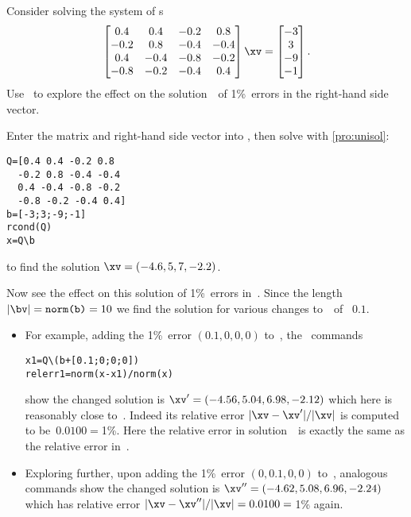 \begin{example}  
Consider solving the system of s
\begin{equation*}
\begin{bmatrix} 0.4&0.4&-0.2&0.8
\\-0.2&0.8&-0.4&-0.4
\\0.4&-0.4&-0.8&-0.2
\\-0.8&-0.2&-0.4&0.4 \end{bmatrix}\xv
=\begin{bmatrix} -3\\3\\-9\\-1 \end{bmatrix}.
\end{equation*}
Use \script\ to explore the effect on the solution~\xv\ of 1\%~errors in the right-hand side vector.
\begin{solution} 
Enter the matrix and right-hand side vector into \script, then solve  with \cref{pro:unisol}:
\setbox\ajrqrbox\hbox{}%
\marginajrbox%
\begin{verbatim}
Q=[0.4 0.4 -0.2 0.8
  -0.2 0.8 -0.4 -0.4
  0.4 -0.4 -0.8 -0.2
  -0.8 -0.2 -0.4 0.4]
b=[-3;3;-9;-1]
rcond(Q)
x=Q\b
\end{verbatim}
to find the solution \(\xv=(-4.6,5,7,-2.2)\).

Now see the effect on this solution of 1\%~errors in~\bv.
Since the length \(|\bv|=\verb|norm(b)|=10\) we find the solution for various changes to~\bv\ of ~\(0.1\).
\begin{itemize}\sloppy
\item For example, adding the 1\%~error \((0.1,0,0,0)\) to~\bv, the \script\ commands
\begin{verbatim}
x1=Q\(b+[0.1;0;0;0])
relerr1=norm(x-x1)/norm(x)
\end{verbatim}
show the changed solution is \(\xv'=(-4.56,5.04,6.98,-2.12)\) which here is reasonably close to~\xv.
Indeed its relative error \(|\xv-\xv'|/|\xv|\) is computed to be~\(0.0100={}\)1\%.
Here the relative error in solution~\xv\ is exactly the same as the relative error in~\bv.

\item Exploring further, upon adding the 1\%~error \((0,0.1,0,0)\) to~\bv, analogous commands show the changed solution is \(\xv''=(-4.62,5.08,6.96,-2.24)\) which has relative error \(|\xv-\xv''|/|\xv|=0.0100={}\)1\% again.


\end{itemize}
\end{solution}
\end{example}
